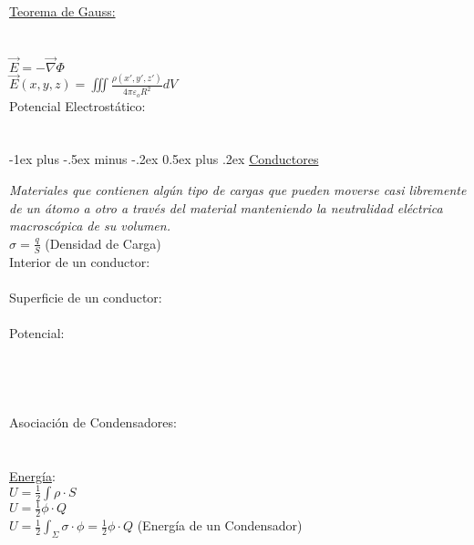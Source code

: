 \documentclass[10pt,landscape]{article}
\makeatletter
\renewcommand{\section}{\@startsection{section}{1}{0mm}%
                                {-1ex plus -.5ex minus -.2ex}%
                                {0.5ex plus .2ex}%
                                {\normalfont\large\bfseries}}
\makeatother
\begin{document}
\begin{multicols}{3}
	\underline{Teorema de Gauss:}\\ 
		\\
		\\
		$\vec{E} = -\vec{\nabla} \Phi$ \\
		$\vec{E}(x,y,z) = \iiint \frac{\rho(x',y',z')}{4\pi\varepsilon_o R^{2}} dV$\\
	Potencial Electrostático:\\
	    \\
	    \\
	

\section{\underline{Conductores}}	
	
	\textit{Materiales que contienen algún tipo de cargas que pueden moverse casi libremente de un átomo a otro a través del material manteniendo la neutralidad eléctrica macroscópica de su volumen.}\\
	
	$\sigma = \frac{q}{S}$ (Densidad de Carga)\\
	Interior de un conductor:\\
	     \\
	Superficie de un conductor:\\
	     \\
	Potencial: \\
	     \\
	        \\
	     \\
	        \\

	Asociación de Condensadores:\\
	    \\
	    \\
	\underline{Energía}: \\
	$ U = \frac{1}{2} \int \rho \cdot S$ \\
	$ U = \frac{1}{2} \phi \cdot Q$ \\
	$  U = \frac{1}{2} \int_\Sigma \sigma \cdot \phi = \frac{1}{2} \phi \cdot Q $ (Energía de un Condensador)\\
	    

\end{multicols}
\end{document}
